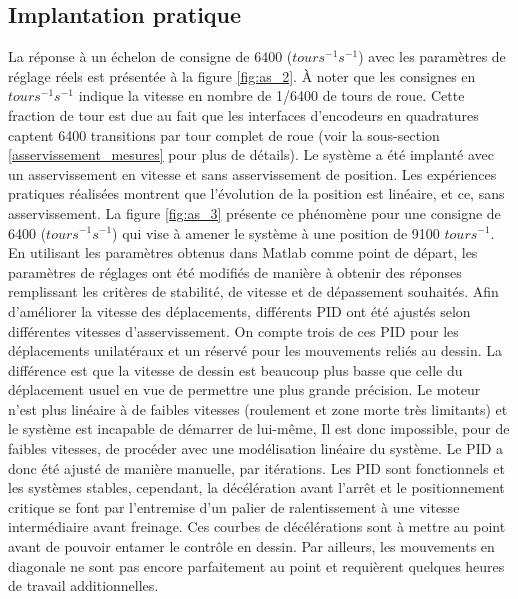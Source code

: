 \subsection{Implantation pratique}
\label{s:ass_implantation_pratique}
La réponse à un échelon de consigne de 6400 ($tours^{-1} s^{-1}$) avec les paramètres de réglage réels est présentée à la figure \ref{fig:as_2}. À noter que les consignes en $tours^{-1} s^{-1}$ indique la vitesse en nombre de 1/6400 de tours de roue. Cette fraction de tour est due au fait que les interfaces d'encodeurs en quadratures captent 6400 transitions par tour complet de roue (voir la sous-section \ref{asservissement_mesures} pour plus de détails).
Le système a été implanté avec un asservissement en vitesse et sans asservissement de position. Les expériences pratiques réalisées montrent que l'évolution de la position est linéaire, et ce, sans asservissement. La figure \ref{fig:as_3} présente ce phénomène pour une consigne de 6400 ($tours^{-1} s^{-1}$) qui vise à amener le système à une position de 9100 $tours^{-1}$.
En utilisant les paramètres obtenus dans Matlab comme point de départ, les paramètres de réglages ont été modifiés de manière à obtenir des réponses remplissant les critères de stabilité, de vitesse et de dépassement souhaités. Afin d'améliorer la vitesse des déplacements, différents PID ont été ajustés selon différentes vitesses d'asservissement. On compte trois de ces PID pour les déplacements unilatéraux et un réservé pour les mouvements reliés au dessin. La différence est que la vitesse de dessin est beaucoup plus basse que celle du déplacement usuel en vue de permettre une plus grande précision. Le moteur n'est plus linéaire à de faibles vitesses (roulement et zone morte très limitants) et le système est incapable de démarrer de lui-même, Il est donc impossible, pour de faibles vitesses, de procéder avec une modélisation linéaire du système. Le PID a donc été ajusté de manière manuelle, par itérations. Les PID sont fonctionnels et les systèmes stables, cependant, la décélération avant l'arrêt et le positionnement critique se font par l'entremise d'un palier de ralentissement à une vitesse intermédiaire avant freinage. Ces courbes de décélérations sont à mettre au point avant de pouvoir entamer le contrôle en dessin. Par ailleurs, les mouvements en diagonale ne sont pas encore parfaitement au point et requièrent quelques heures de travail additionnelles.
